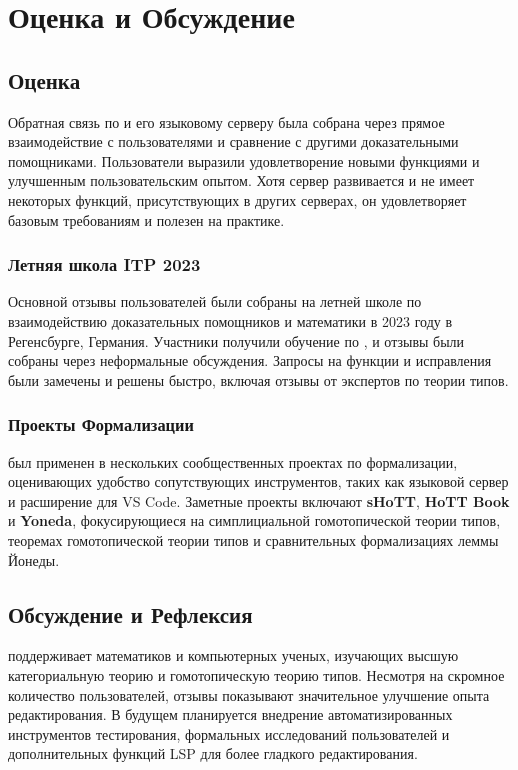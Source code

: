 \chapter{Оценка и Обсуждение}
\label{chap:eval}

\section{Оценка}

Обратная связь по \Rzk{} и его языковому серверу была собрана через прямое взаимодействие с пользователями и сравнение с другими доказательными помощниками. Пользователи выразили удовлетворение новыми функциями и улучшенным пользовательским опытом. Хотя сервер развивается и не имеет некоторых функций, присутствующих в других серверах, он удовлетворяет базовым требованиям и полезен на практике.

\subsection{Летняя школа ITP 2023}

Основной отзывы пользователей были собраны на летней школе по взаимодействию доказательных помощников и математики в 2023 году в Регенсбурге, Германия. Участники получили обучение по \Rzk{}, и отзывы были собраны через неформальные обсуждения. Запросы на функции и исправления были замечены и решены быстро, включая отзывы от экспертов по теории типов.

\subsection{Проекты Формализации}

\Rzk{} был применен в нескольких сообщественных проектах по формализации, оценивающих удобство сопутствующих инструментов, таких как языковой сервер и расширение для VS Code. Заметные проекты включают \textbf{sHoTT}, \textbf{HoTT Book} и \textbf{Yoneda}, фокусирующиеся на симплициальной гомотопической теории типов, теоремах гомотопической теории типов и сравнительных формализациях леммы Йонеды.

\section{Обсуждение и Рефлексия}

\Rzk{} поддерживает математиков и компьютерных ученых, изучающих высшую категориальную теорию и гомотопическую теорию типов. Несмотря на скромное количество пользователей, отзывы показывают значительное улучшение опыта редактирования. В будущем планируется внедрение автоматизированных инструментов тестирования, формальных исследований пользователей и дополнительных функций LSP для более гладкого редактирования.
